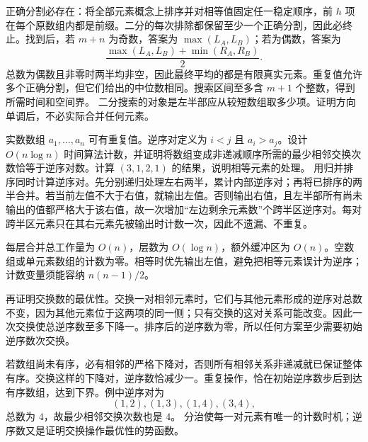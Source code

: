 正确分割必存在：将全部元素概念上排序并对相等值固定任一稳定顺序，前 $h$ 项在每个原数组内都是前缀。二分的每次排除都保留至少一个正确分割，因此必终止。找到后，若 $m+n$ 为奇数，答案为 $\max(L_A,L_B)$；若为偶数，答案为
\[
\frac{\max(L_A,L_B)+\min(R_A,R_B)}2.
\]
总数为偶数且非零时两半均非空，因此最终平均的都是有限真实元素。重复值允许多个正确分割，但它们给出的中位数相同。搜索区间至多含 $m+1$ 个整数，得到所需时间和空间界。
\insight 二分搜索的对象是左半部应从较短数组取多少项。证明方向单调后，不必实际合并任何元素。

实数数组 $a_1,\ldots,a_n$ 可有重复值。逆序对定义为 $i<j$ 且 $a_i>a_j$。设计 $O(n\log n)$ 时间算法计数，并证明将数组变成非递减顺序所需的最少相邻交换次数恰等于逆序对数。计算 $(3,1,2,1)$ 的结果，说明相等元素的处理。
\solution 用归并排序同时计算逆序对。先分别递归处理左右两半，累计内部逆序对；再将已排序的两半合并。若当前左值不大于右值，就输出左值。否则输出右值，且左半部所有尚未输出的值都严格大于该右值，故一次增加“左边剩余元素数”个跨半区逆序对。每对跨半区元素只在其右元素先被输出时计数一次，因此不遗漏、不重复。

每层合并总工作量为 $O(n)$，层数为 $O(\log n)$，额外缓冲区为 $O(n)$。空数组或单元素数组的计数为零。相等时优先输出左值，避免把相等元素误计为逆序；计数变量须能容纳 $n(n-1)/2$。

再证明交换数的最优性。交换一对相邻元素时，它们与其他元素形成的逆序对总数不变，因为其他元素位于这两项的同一侧；只有交换的这对关系可能改变。因此一次交换使总逆序数至多下降一。排序后的逆序数为零，所以任何方案至少需要初始逆序数次交换。

若数组尚未有序，必有相邻的严格下降对，否则所有相邻关系非递减就已保证整体有序。交换这样的下降对，逆序数恰减少一。重复操作，恰在初始逆序数步后到达有序数组，达到下界。例中逆序对为
\[
(1,2),(1,3),(1,4),(3,4),
\]
总数为 $4$，故最少相邻交换次数也是 $4$。
\insight 分治使每一对元素有唯一的计数时机；逆序数又是证明交换操作最优性的势函数。
